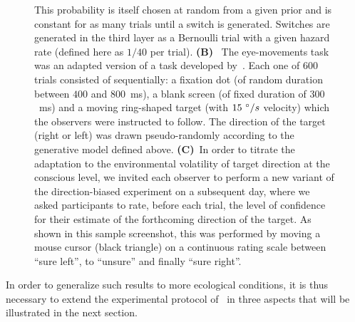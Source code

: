 \documentclass[12pt,english]{article}%
\newcommand{\ms}{\si{\milli\second}}%
\newcommand{\citet}[1]{\textcite{#1}}
\begin{document}
\begin{figure}
{This probability is itself chosen at random from a given prior
and is constant for as many trials until a switch is generated.
Switches are generated in the third layer as a Bernoulli trial
with a given hazard rate (defined here as $1/40$ per trial).
\textbf{(B)}~
The eye-movements task was an adapted version of a task developed by~\citet{Montagnini2010}.
Each one of $600$ trials consisted of sequentially:
a fixation dot (of random duration between $400$ and $800$~\ms),
a blank screen (of fixed duration of  $300$~\ms) and
a moving ring-shaped target (with $15~\degree/s$ velocity) which the observers were instructed to follow.
The direction of the target (right or left) was drawn pseudo-randomly
according to the generative model defined above.
\textbf{(C)}~In order to titrate the adaptation
to the environmental volatility of target direction at the conscious level,
we invited each observer to perform a new variant of the direction-biased experiment on a subsequent day,
where we asked participants to rate, before each trial, the level of confidence
for their estimate of the forthcoming direction of the target.
As shown in this sample screenshot,
this was performed by moving a mouse cursor (black triangle) on a continuous rating scale
between ``sure left'', to ``unsure'' and finally ``sure right''.
}
\label{fig:intro}
\end{figure}
In order to generalize such results to more ecological conditions,
it is thus necessary to extend the experimental protocol of~\citet{Montagnini2010} in three aspects that will be illustrated in the next section.
\end{document}
